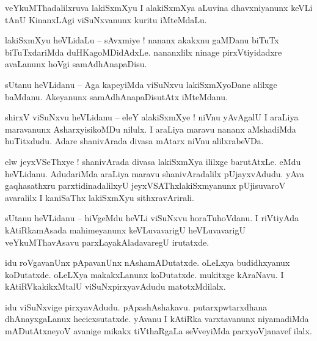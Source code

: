 \documentclass{article}
\begin{document}
\begin{mn}%
veYkuMThadalilxruva lakiSxmXyu I alakiSxmXya aLuvina dhavxniyanunx keVLi tAnU KinanxLAgi 
viSuNxvanunx kuritu iMteMdaLu.
\end{mn}

\begin{mn}%
lakiSxmXyu heVLidaLu -- sAvxmiye ! nananx akakxnu gaMDanu biTuTx biTuTxdariMda duHKagoMDidAdxLe. 
nananxlilx ninage pirxVtiyidadxre avaLanunx hoVgi samAdhAnapaDisu.
\end{mn}

\begin{mn}%
sUtanu heVLidanu -- Aga kapeyiMda viSuNxvu lakiSxmXyoDane alilxge baMdanu. Akeyanunx 
samAdhAnapaDisutAtx iMteMdanu.
\end{mn}

\begin{mn}%
shirxV viSuNxvu heVLidanu -- eleY alakiSxmXye ! niVnu yAvAgalU I araLiya maravanunx 
AsharxyisikoMDu nilulx. I araLiya maravu nananx aMshadiMda huTitxdudu. Adare shanivArada divasa 
mAtarx niVnu alilxrabeVDa.
\end{mn}

\begin{mn}%
elw jeyxVSeThxye ! shanivArada divasa lakiSxmXya ililxge barutAtxLe. eMdu heVLidanu. AdudariMda 
araLiya maravu shanivAradalilx pUjayxvAdudu. yAva gaqhasathxru parxtidinadalilxyU 
jeyxVSAThxlakiSxmyanunx pUjisuvaroV avaralilx I kaniSaThx lakiSxmXyu sithxravArirali.
\end{mn}

\begin{mn}%
sUtanu heVLidanu -- hiVgeMdu heVLi viSuNxvu horaTuhoVdanu. I riVtiyAda kAtiRkamAsada mahimeyanunx 
keVLuvavarigU heVLuvavarigU veYkuMThavAsavu parxLayakAladavaregU irutatxde.
\end{mn}

\begin{mn}%
idu roVgavanUnx pApavanUnx nAshamADutatxde. oLeLxya budidhxyanux koDutatxde. oLeLXya makakxLanunx 
koDutatxde. mukitxge kAraNavu. I kAtiRVkakikxMtalU viSuNxpirxyavAdudu matotxMdilalx.
\end{mn}

\begin{mn}%
idu viSuNxvige pirxyavAdudu. pApashAshakavu. putarxpwtarxdhana dhAnayxgaLanux hecicxsutatxde. 
yAvanu I kAtiRka varxtavanunx niyamadiMda mADutAtxneyoV avanige mikakx tiVthaRgaLa seVveyiMda 
parxyoVjanavef ilalx.
\end{mn}
\end{document}
